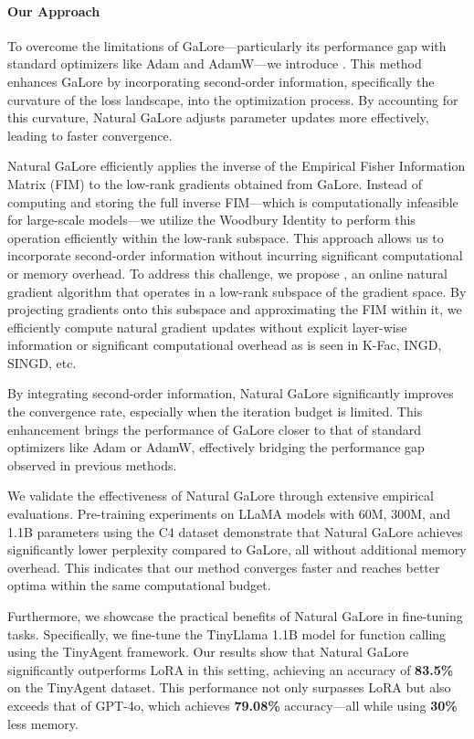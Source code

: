 \paragraph{Our Approach}

 To overcome the limitations of GaLore—particularly its performance gap with standard optimizers like Adam and AdamW—we introduce \textit{\lowrank}. This method enhances GaLore by incorporating second-order information, specifically the curvature of the loss landscape, into the optimization process. By accounting for this curvature, Natural GaLore adjusts parameter updates more effectively, leading to faster convergence.

 Natural GaLore efficiently applies the inverse of the Empirical Fisher Information Matrix (FIM) to the low-rank gradients obtained from GaLore. Instead of computing and storing the full inverse FIM—which is computationally infeasible for large-scale models—we utilize the Woodbury Identity to perform this operation efficiently within the low-rank subspace. This approach allows us to incorporate second-order information without incurring significant computational or memory overhead. To address this challenge, we propose \textit{\lowrank}, an online natural gradient algorithm that operates in a low-rank subspace of the gradient space. By projecting gradients onto this subspace and approximating the FIM within it, we efficiently compute natural gradient updates without explicit layer-wise information or significant computational overhead as is seen in K-Fac, INGD, SINGD, etc.

 By integrating second-order information, Natural GaLore significantly improves the convergence rate, especially when the iteration budget is limited. This enhancement brings the performance of GaLore closer to that of standard optimizers like Adam or AdamW, effectively bridging the performance gap observed in previous methods.

 We validate the effectiveness of Natural GaLore through extensive empirical evaluations. Pre-training experiments on LLaMA models with 60M, 300M, and 1.1B parameters using the C4 dataset demonstrate that Natural GaLore achieves significantly lower perplexity compared to GaLore, all without additional memory overhead. This indicates that our method converges faster and reaches better optima within the same computational budget.

 Furthermore, we showcase the practical benefits of Natural GaLore in fine-tuning tasks. Specifically, we fine-tune the TinyLlama 1.1B model for function calling using the TinyAgent framework. Our results show that Natural GaLore significantly outperforms LoRA in this setting, achieving an accuracy of \textbf{83.5\%} on the TinyAgent dataset. This performance not only surpasses LoRA but also exceeds that of GPT-4o, which achieves \textbf{79.08\%} accuracy—all while using \textbf{30\%} less memory.

